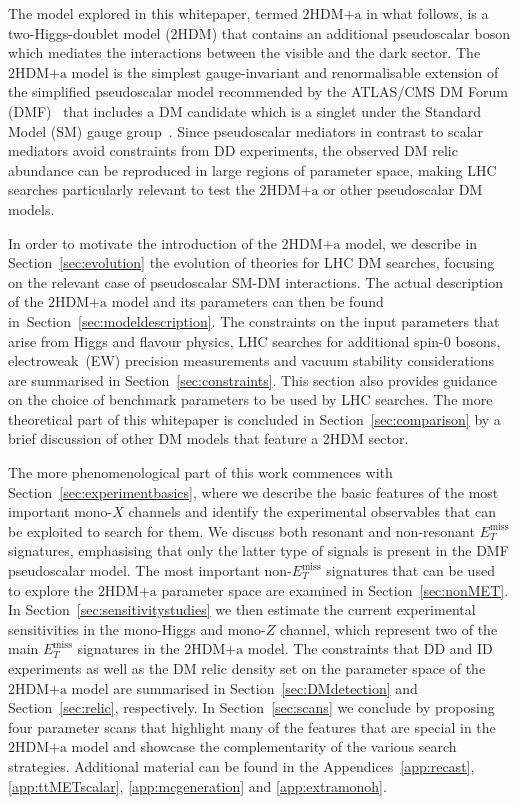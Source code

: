 \documentclass[a4paper, 11pt,notoc]{article}
\newcommand{\MET}{\ensuremath{E_T^\mathrm{miss}}\xspace}
\newcommand{\hdma}{\ensuremath{\textrm{2HDM+a}}\xspace}
\begin{document}
The model explored in this whitepaper,  termed \hdma in what follows,  is a two-Higgs-doublet model (2HDM) that contains an additional pseudoscalar boson which  mediates the interactions between the visible and the dark sector.  The \hdma model is the simplest gauge-invariant and renormalisable extension of the  simplified pseudoscalar model recommended by the ATLAS/CMS DM Forum (DMF)~\cite{Abercrombie:2015wmb} that  includes a  DM candidate which is a singlet under the Standard Model (SM) gauge group~\cite{Ipek:2014gua,No:2015xqa,Goncalves:2016iyg,Bauer:2017ota,Tunney:2017yfp}.  Since pseudoscalar mediators in contrast to scalar mediators avoid constraints from DD experiments, the observed DM relic abundance can be reproduced in large regions of parameter space, making LHC searches particularly relevant to test the \hdma or other pseudoscalar DM models.

In order to motivate the introduction of the \hdma model, we describe in Section~\ref{sec:evolution} the evolution of theories for LHC DM searches, focusing on the relevant case of pseudoscalar SM-DM interactions. The actual description of the \hdma model and its parameters can then be found in~Section~\ref{sec:modeldescription}. The constraints on the input parameters that arise from Higgs and flavour physics, LHC searches for additional {\color{red} spin-0 bosons}, electroweak~(EW) precision measurements and vacuum stability considerations are summarised in Section~\ref{sec:constraints}. This section also provides guidance on the choice of benchmark parameters to be used by LHC searches. {\color{red} The more theoretical part of this whitepaper is concluded in Section~\ref{sec:comparison} by a brief discussion of other DM models that feature a 2HDM sector. }

The more phenomenological part of this work commences with Section~\ref{sec:experimentbasics}, where we describe the basic features of the most important mono-$X$ channels and identify the experimental observables that can be exploited to search for them. We discuss both resonant and non-resonant $\MET$ signatures, emphasising that only the latter type of signals is present in the DMF pseudoscalar model. The most important non-$\MET$ signatures that can be used to explore the \hdma parameter space  are examined in Section~\ref{sec:nonMET}. In Section~\ref{sec:sensitivitystudies} we then estimate the current experimental sensitivities  in the mono-Higgs and mono-$Z$ channel, which represent two of the main $\MET$ signatures in the \hdma model. The constraints that DD and ID experiments as well as the DM relic density set on the parameter space of the \hdma model are summarised in Section~\ref{sec:DMdetection} and Section~\ref{sec:relic}, respectively. In Section~\ref{sec:scans} we conclude by proposing four parameter scans that highlight many of the features that are special in the \hdma model and showcase the complementarity of the various search strategies.  Additional material can be found in the Appendices~\ref{app:recast}, \ref{app:ttMETscalar}, \ref{app:mcgeneration} and \ref{app:extramonoh}.
\end{document}
